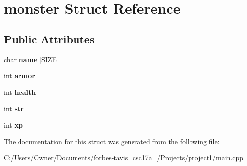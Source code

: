 \hypertarget{structmonster}{}\section{monster Struct Reference}
\label{structmonster}
\subsection*{Public Attributes}
\begin{DoxyCompactItemize}
\item 
\hypertarget{structmonster_af88ad4c683ea107e563851661e247c0f}{}char {\bfseries name} \mbox{[}S\+I\+Z\+E\mbox{]}\label{structmonster_af88ad4c683ea107e563851661e247c0f}

\item 
\hypertarget{structmonster_a1c8183b6e3e82961743d540ec3670437}{}int {\bfseries armor}\label{structmonster_a1c8183b6e3e82961743d540ec3670437}

\item 
\hypertarget{structmonster_a04a98de0f51a49a10ab49298c42a6bc4}{}int {\bfseries health}\label{structmonster_a04a98de0f51a49a10ab49298c42a6bc4}

\item 
\hypertarget{structmonster_a9a58509418999df0b87c6cf535d7c7fc}{}int {\bfseries str}\label{structmonster_a9a58509418999df0b87c6cf535d7c7fc}

\item 
\hypertarget{structmonster_aac014eb99e5d2cd5c5a03695e9b41a51}{}int {\bfseries xp}\label{structmonster_aac014eb99e5d2cd5c5a03695e9b41a51}

\end{DoxyCompactItemize}


The documentation for this struct was generated from the following file\+:\begin{DoxyCompactItemize}
\item 
C\+:/\+Users/\+Owner/\+Documents/forbes-\/tavis\+\_\+csc17a\+\_/\+Projects/project1/main.\+cpp\end{DoxyCompactItemize}

